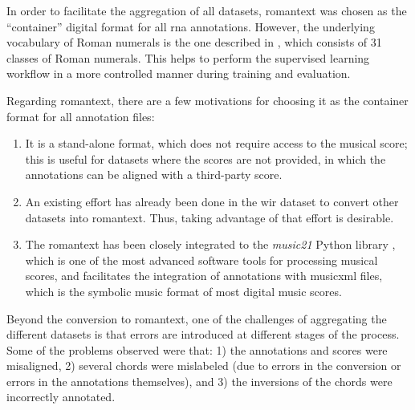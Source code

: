 
In order to facilitate the aggregation of all datasets,
\gls{romantext} was chosen as the ``container'' digital
format for all \gls{rna} annotations. However, the
underlying vocabulary of Roman numerals is the one described
in , which
consists of 31 classes of Roman numerals. This helps to
perform the supervised learning workflow in a more
controlled manner during training and evaluation.

Regarding \gls{romantext}, there are a few motivations for
choosing it as the container format for all annotation
files:

\begin{enumerate} 
    \item It is a stand-alone format, which does not require
    access to the musical score; this is useful for datasets
    where the scores are not provided, in which the
    annotations can be aligned with a third-party score.
    \item An existing effort has already been done in the
    \gls{wir} dataset
    \parencite{gotham2019romantext, gotham2022openscore}
    to convert other datasets into \gls{romantext}. Thus,
    taking advantage of that effort is desirable.
    \item The \gls{romantext} has been closely integrated to
    the \emph{music21} Python library
    \parencite{cuthbert2010music21}, which is one of the
    most advanced software tools for processing musical
    scores, and facilitates the integration of annotations
    with \gls{musicxml} files, which is the symbolic music
    format of most digital music scores.
\end{enumerate}

Beyond the conversion to \gls{romantext}, one of the
challenges of aggregating the different datasets is that
errors are introduced at different stages of the process.
Some of the problems observed were that: 1) the annotations
and scores were misaligned, 2) several chords were
mislabeled (due to errors in the conversion or errors in the
annotations themselves), and 3) the inversions of the chords
were incorrectly annotated.


